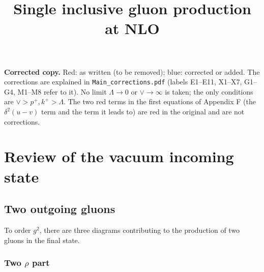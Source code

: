 \documentclass[10pt]{article}
\title{Single inclusive gluon production at NLO}
\numberwithin{equation}{section}
\begin{document}
\maketitle
\allowdisplaybreaks
\tableofcontents
{\color{blue}\noindent\textbf{Corrected copy.} Red: as written (to be removed); blue: corrected or added.
The corrections are explained in \texttt{Main\_corrections.pdf} (labels E1--E11, X1--X7, G1--G4, M1--M8 refer to it).
No limit $\Lambda\to0$ or $\vee\to\infty$ is taken; the only conditions are $\vee>p^+,k^+>\Lambda$. The two red terms in the first equations of Appendix F (the $\delta^2(u-v)$ term and the term it leads to) are red in the original and are not corrections.}


\section{Review of the vacuum incoming state}\label{sec:vac}
\subsection{Two outgoing gluons}
To order $g^2$, there are three  diagrams contributing to the production of two gluons in the final state.

\subsubsection{Two $\rho$ part}
\end{document}
